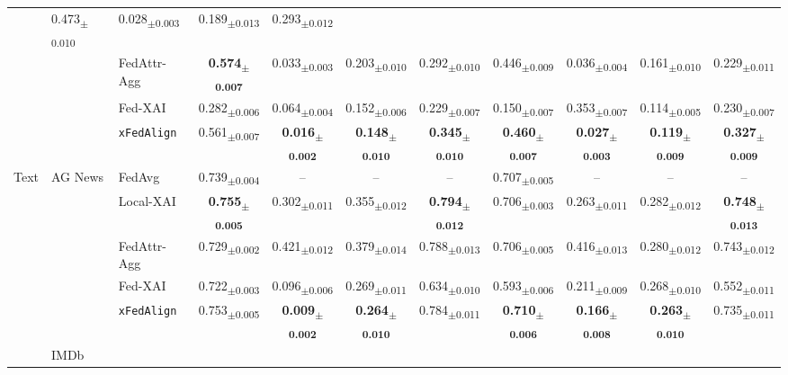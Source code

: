 \documentclass{article}
\newcommand{\meanstd}[2]{#1\textsubscript{\scriptsize$\pm$#2}}
\theoremstyle{plain}
\theoremstyle{definition}
\theoremstyle{remark}
\begin{document}
\begin{table}[t]
{\begin{tabular}{lllcccccccc}
      & \meanstd{0.473}{0.010} & \meanstd{0.028}{0.003} & \meanstd{0.189}{0.013} & \meanstd{0.293}{0.012} \\
  &  & FedAttr-Agg      
      & \textbf{\meanstd{0.574}{0.007}} & \meanstd{0.033}{0.003} & \meanstd{0.203}{0.010} & \meanstd{0.292}{0.010}
      & \meanstd{0.446}{0.009} & \meanstd{0.036}{0.004} & \meanstd{0.161}{0.010} & \meanstd{0.229}{0.011} \\
  &  & Fed-XAI      
      & \meanstd{0.282}{0.006} & \meanstd{0.064}{0.004} & \meanstd{0.152}{0.006} & \meanstd{0.229}{0.007}
      & \meanstd{0.150}{0.007} & \meanstd{0.353}{0.007} & \meanstd{0.114}{0.005} & \meanstd{0.230}{0.007} \\
  &  & \texttt{xFedAlign}      
      & \meanstd{0.561}{0.007} & \textbf{\meanstd{0.016}{0.002}} & \textbf{\meanstd{0.148}{0.010}} & \textbf{\meanstd{0.345}{0.010}}
      & \textbf{\meanstd{0.460}{0.007}} & \textbf{\meanstd{0.027}{0.003}} & \textbf{\meanstd{0.119}{0.009}} & \textbf{\meanstd{0.327}{0.009}} \\
\midrule
\multirow{10}{*}{\centering Text} 
  & \multirow{5}{*}{\centering AG News} 
    & FedAvg      
      & \meanstd{0.739}{0.004} & -- & -- & -- 
      & \meanstd{0.707}{0.005} & -- & -- & -- \\
  &  & Local-XAI      
      & \textbf{\meanstd{0.755}{0.005}} & \meanstd{0.302}{0.011} & \meanstd{0.355}{0.012} & \textbf{\meanstd{0.794}{0.012}}
      & \meanstd{0.706}{0.003} & \meanstd{0.263}{0.011} & \meanstd{0.282}{0.012} & \textbf{\meanstd{0.748}{0.013}} \\
  &  & FedAttr-Agg      
      & \meanstd{0.729}{0.002} & \meanstd{0.421}{0.012} & \meanstd{0.379}{0.014} & \meanstd{0.788}{0.013}
      & \meanstd{0.706}{0.005} & \meanstd{0.416}{0.013} & \meanstd{0.280}{0.012} & \meanstd{0.743}{0.012} \\
  &  & Fed-XAI      
      & \meanstd{0.722}{0.003} & \meanstd{0.096}{0.006} & \meanstd{0.269}{0.011} & \meanstd{0.634}{0.010}
      & \meanstd{0.593}{0.006} & \meanstd{0.211}{0.009} & \meanstd{0.268}{0.010} & \meanstd{0.552}{0.011} \\
  &  & \texttt{xFedAlign}      
      & \meanstd{0.753}{0.005} & \textbf{\meanstd{0.009}{0.002}} & \textbf{\meanstd{0.264}{0.010}} & \meanstd{0.784}{0.011}
      & \textbf{\meanstd{0.710}{0.006}} & \textbf{\meanstd{0.166}{0.008}} & \textbf{\meanstd{0.263}{0.010}} & \meanstd{0.735}{0.011} \\
      \arrayrulecolor{gray!60}
\cmidrule(lr){2-11}
\arrayrulecolor{black}
  & \multirow{5}{*}{\centering IMDb} 

\end{tabular}}
\end{table}
\end{document}
